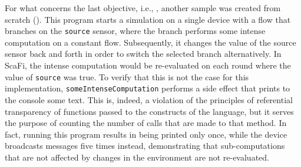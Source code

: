 For what concerns the last objective, i.e., , another sample was created from scratch ().
%
This program starts a simulation on a single device with a flow that branches on the \texttt{source} sensor, where the  branch performs some intense computation on a constant flow.
%
Subsequently, it changes the value of the source sensor back and forth in order to switch the selected branch alternatively.
%
In ScaFi, the intense computation would be re-evaluated on each round where the value of \texttt{source} was true.
%
To verify that this is not the case for this implementation, \texttt{someIntenseComputation} performs a side effect that prints to the console some text.
%
This is, indeed, a violation of the principles of referential transparency of functions passed to the constructs of the language, but it serves the purpose of counting the number of calls that are made to that method.
%
In fact, running this program results in  being printed only once, while the device broadcasts messages five times instead, demonstrating that sub-computations that are not affected by changes in the environment are not re-evaluated.
%


